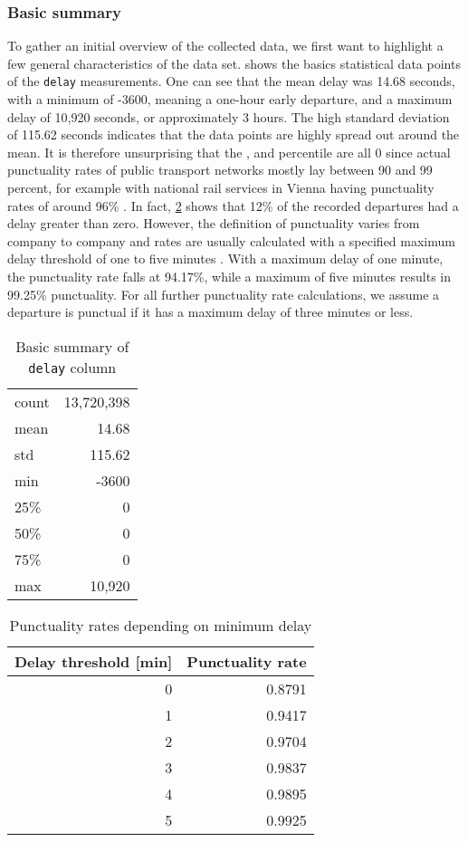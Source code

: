 \subsubsection{Basic summary}

To gather an initial overview of the collected data, we first want to highlight a few general characteristics of the data set.  shows the basics statistical data points of the \texttt{delay} measurements. One can see that the mean delay was 14.68 seconds, with a minimum of -3600, meaning a one-hour early departure, and a maximum delay of 10,920 seconds, or approximately 3 hours. The high standard deviation of 115.62 seconds indicates that the data points are highly spread out around the mean. It is therefore unsurprising that the ,  and  percentile are all 0 since actual punctuality rates of public transport networks mostly lay between 90 and 99 percent, for example with national rail services in Vienna having punctuality rates of around 96\% \autocite{oebb-2023b}. In fact, \cref{table:punctuality} shows that 12\% of the recorded departures had a delay greater than zero. However, the definition of punctuality varies from company to company and rates are usually calculated with a specified maximum delay threshold of one to five minutes \autocite[723]{chen-2009}. With a maximum delay of one minute, the punctuality rate falls at 94.17\%, while a maximum of five minutes results in 99.25\% punctuality. For all further punctuality rate calculations, we assume a departure is punctual if it has a maximum delay of three minutes or less.

\begin{table}
	\centering
	\begin{tabular}{lr}
		\toprule
		count &  13,720,398 \\
		mean  &  14.68 \\
		std   &  115.62 \\
		min   & -3600 \\
		25\%   &  0 \\
		50\%   &  0 \\
		75\%   &  0 \\
		max   &  10,920 \\
		\bottomrule
	\end{tabular}
	\caption{Basic summary of \texttt{delay} column}
	\label{table:basics}
\end{table}

\begin{table}
	\centering
	\begin{tabular}{rr}
		\toprule
		Delay threshold [min] & Punctuality rate \\
		\midrule
		0 &  0.8791 \\
		1  &  0.9417 \\
		2   &  0.9704 \\
		3   & 0.9837 \\
		4   & 0.9895 \\
		5   &  0.9925 \\
		\bottomrule
	\end{tabular}
	\caption{Punctuality rates depending on minimum delay}
	\label{table:punctuality}
\end{table}

